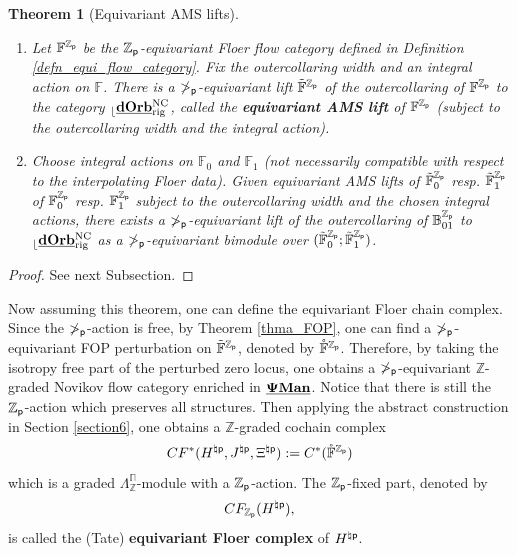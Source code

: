 \documentclass[reqno, 10pt]{amsart}
\numberwithin{equation}{section}
\numberwithin{equation}{section}
\newtheorem{thm}{Theorem}[section]
\theoremstyle{definition}
\theoremstyle{remark}
\newcommand{\beqn}{\begin{equation*}}
\newcommand{\eeqn}{\end{equation*}}
\newcommand{\mb}{\mathbb}
\newcommand{\p}{{\sf p}}
\newcommand{\zp}{{{\mb Z}_{\sf p}}}
\renewcommand{\outer}{{}_{\lfloor}}
\newcommand{\pman}{\uds{{\bf \Psi}{\bf Man}}}
\newcommand{\uds}[1]{\underline{\smash{#1}}}
\begin{document}
\begin{thm}[Equivariant AMS lifts]\label{thm_equivariant_lift} \hfill


\begin{enumerate}

\item Let ${\mb F}^{\zp}$ be the $\zp$-equivariant Floer flow category defined in Definition \ref{defn_equi_flow_category}. Fix the outercollaring width and an integral action on ${\mb F}$. There is a $\mb\Pi_\p$-equivariant lift $\tilde{\mb F}^{\zp}$ of the outercollaring of ${\mb F}^{\zp}$ to the category $\outer \uds{\bf dOrb}^{\rm NC}_{\rm rig}$, called the {\bf equivariant AMS lift} of $\mb{F}^\zp$ (subject to the outercollaring width and the integral action).

\item Choose integral actions on ${\mb F}_0$ and ${\mb F}_1$ (not necessarily compatible with respect to the interpolating Floer data). Given equivariant AMS lifts of $\tilde {\mb F}_0^{\zp}$ resp. $\tilde {\mb F}_1^{\zp}$ of ${\mb F}_0^{\zp}$ resp. ${\mb F}_1^\zp$ subject to the outercollaring width and the chosen integral actions, there exists a $\mb\Pi_\p$-equivariant lift of the outercollaring of $\mb{B}_{01}^{\zp}$ to $\outer \uds{\bf dOrb}^{\rm NC}_{\rm rig}$ as a $\mb\Pi_\p$-equivariant bimodule over $(\tilde {\mb F}_0^{\zp}; \tilde {\mb F}_1^{\zp})$.
\end{enumerate}
\end{thm}

\begin{proof}
See next Subsection.
\end{proof}

Now assuming this theorem, one can define the equivariant Floer chain complex. Since the $\mb\Pi_\p$-action is free, by Theorem \ref{thma_FOP}, one can find a $\mb\Pi_\p$-equivariant FOP perturbation on $\tilde{\mb F}^\zp$, denoted by $\mathring {\mb F}^{\zp}$. Therefore, by taking the isotropy free part of the perturbed zero locus, one obtains a $\mb\Pi_\p$-equivariant ${\mb Z}$-graded Novikov flow category enriched in $\pman$. Notice that there is still the $\zp$-action which preserves all structures. Then applying the abstract construction in Section \ref{section6}, one obtains a ${\mb Z}$-graded cochain complex 
\beqn
CF^*(H^{\natural \p}, J^{\natural \p}, \Xi^{\natural \p}):= C^*(\mathring {\mb F}^\zp)
\eeqn 
which is a graded $\Lambda_{\mb Z}^{\mb\Pi}$-module with a $\zp$-action. The $\zp$-fixed part, denoted by 
\beqn
CF_{\zp}(H^{\natural \p}),
\eeqn
is called the (Tate) {\bf equivariant Floer complex} of $H^{\natural \p}$.
\end{document}
